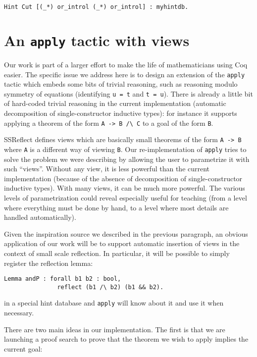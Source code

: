 \documentclass[nocopyrightspace,blockstyle,numbers]{sigplanconf}
\begin{document}
\begin{verbatim}
Hint Cut [(_*) or_introl (_*) or_introl] : myhintdb.
\end{verbatim}

\section{An \texttt{apply} tactic with views}

Our work is part of a larger effort to make the life of mathematicians
using Coq easier. The specific issue we address here is to design an
extension of the \texttt{apply} tactic which embeds some bits of
trivial reasoning, such as reasoning modulo symmetry of equations
(identifying \texttt{u = t} and \texttt{t = u}).
There is already a little bit of hard-coded trivial reasoning in the
current implementation (automatic decomposition of single-constructor
inductive types): for instance it supports applying a theorem
of the form \verb|A -> B /\ C| to a goal of the form \texttt{B}.

SSReflect defines views which are basically small theorems of
the form \texttt{A -> B} where \texttt{A} is a different way of
viewing \texttt{B}. Our re-implementation of \texttt{apply} tries to
solve the problem we were describing by allowing the user to
parametrize it with such ``views''. Without any view, it is less
powerful than the current implementation (because of the absence of
decomposition of single-constructor inductive types). With many
views, it can be much more powerful. The various levels of
parametrization could reveal especially useful for teaching (from a
level where everything must be done by hand, to a level where most
details are handled automatically).

Given the inspiration source we described in the previous paragraph,
an obvious application of our work will be to support automatic
insertion of views in the context of small scale reflection. In
particular, it will be possible to simply register the reflection
lemma:

\begin{verbatim}
Lemma andP : forall b1 b2 : bool,
               reflect (b1 /\ b2) (b1 && b2).
\end{verbatim}
in a special hint database and \texttt{apply} will know about it
and use it when necessary.

There are two main ideas in our implementation. The first is that
we are launching a proof search to prove that the theorem
we wish to apply implies the current goal:
\end{document}
